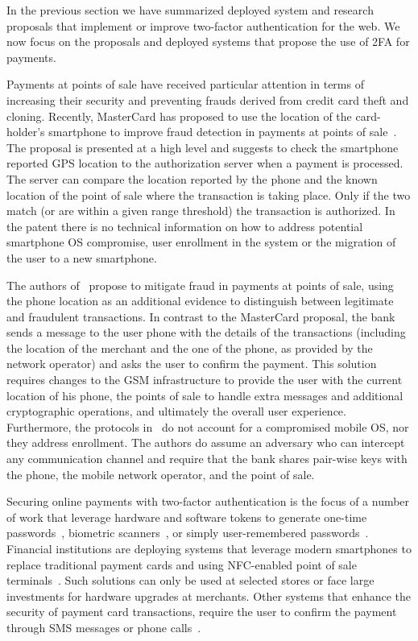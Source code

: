 In the previous section we have summarized deployed system and research proposals that implement or improve two-factor authentication for the web. We now focus on the proposals and deployed systems that propose the use of 2FA for payments.

Payments at points of sale have received particular attention in terms of
increasing their security and preventing frauds derived from credit card theft
and cloning. Recently, MasterCard has proposed to use the location of the
card-holder's smartphone to improve fraud detection in payments at points of
sale~\cite{mastercardpatent}. The proposal is presented at a high level and suggests to check the smartphone reported GPS location to the authorization server when a payment is processed. The server can compare the location reported by the phone and the known location of the point of sale where the transaction is taking place. Only if the two match (or are within a given range threshold) the transaction is authorized. In the patent there is no technical information on how to address potential smartphone OS compromise, user enrollment in the system or the migration of the user to a new smartphone.

The authors of~\cite{park09acsac} propose to mitigate fraud in payments at
points of sale, using the phone location as an additional evidence to
distinguish between legitimate and fraudulent transactions. In contrast to the
MasterCard proposal, the bank sends a message to the user phone with the
details of the transactions (including the location of the merchant and the one
of the phone, as provided by the network operator) and asks the user to confirm
the payment. This solution requires changes to the GSM infrastructure to
provide the user with the current location of his phone, the points of sale to
handle extra messages and additional cryptographic operations, and ultimately
the overall user experience. Furthermore, the protocols in~\cite{park09acsac}
do not account for a compromised mobile OS, nor they address enrollment. The
authors do assume an adversary who can intercept any communication channel and
require that the bank shares pair-wise keys with the phone, the mobile network
operator, and the point of sale.

Securing online payments with two-factor authentication is the focus of a
number of work that leverage hardware and software tokens to generate one-time
passwords~\cite{barclays_pinsentry,paypalkey,rsasecurid}, biometric
scanners~\cite{unitedbankers,utahbank}, or simply user-remembered
passwords~\cite{verifiedbyvisa}. Financial institutions are deploying systems
that leverage modern smartphones to replace traditional payment cards and using
NFC-enabled point of sale terminals~\cite{googlewallet,isis}. Such solutions can
only be used at selected stores or face large investments for hardware upgrades
at merchants.  Other systems that enhance the security of payment card
transactions, require the user to confirm the payment through SMS messages or
phone calls~\cite{validsoft}.

